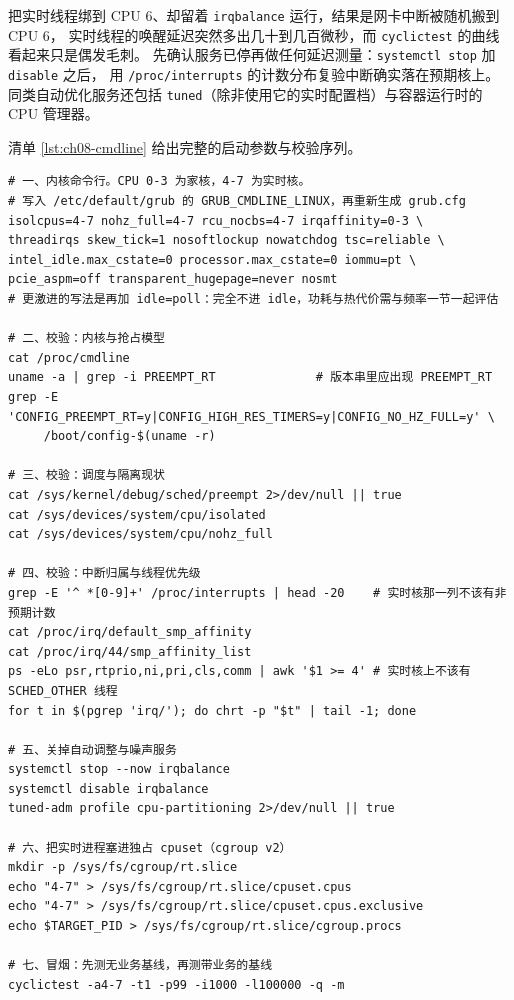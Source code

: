 \documentclass[12pt,a4paper,fontset=fandol]{ctexbook}
\newcommand{\Tp}[1]{\texttt{#1}}
\begin{document}
\begin{warning}[title={只绑核没关 irqbalance：最常见的无效加固}]
把实时线程绑到 CPU 6、却留着 \Tp{irqbalance} 运行，结果是网卡中断被随机搬到 CPU 6，
实时线程的唤醒延迟突然多出几十到几百微秒，而 \Tp{cyclictest} 的曲线看起来只是偶发毛刺。
先确认服务已停再做任何延迟测量：\Tp{systemctl stop} 加 \Tp{disable} 之后，
用 \Tp{/proc/interrupts} 的计数分布复验中断确实落在预期核上。
同类自动优化服务还包括 \Tp{tuned}（除非使用它的实时配置档）与容器运行时的 CPU 管理器。
\end{warning}

清单 \ref{lst:ch08-cmdline} 给出完整的启动参数与校验序列。

\begin{lstlisting}[style=shellstyle,caption={Shell：实时启动参数与校验序列},label={lst:ch08-cmdline}]
# 一、内核命令行。CPU 0-3 为家核，4-7 为实时核。
# 写入 /etc/default/grub 的 GRUB_CMDLINE_LINUX，再重新生成 grub.cfg
isolcpus=4-7 nohz_full=4-7 rcu_nocbs=4-7 irqaffinity=0-3 \
threadirqs skew_tick=1 nosoftlockup nowatchdog tsc=reliable \
intel_idle.max_cstate=0 processor.max_cstate=0 iommu=pt \
pcie_aspm=off transparent_hugepage=never nosmt
# 更激进的写法是再加 idle=poll：完全不进 idle，功耗与热代价需与频率一节一起评估

# 二、校验：内核与抢占模型
cat /proc/cmdline
uname -a | grep -i PREEMPT_RT              # 版本串里应出现 PREEMPT_RT
grep -E 'CONFIG_PREEMPT_RT=y|CONFIG_HIGH_RES_TIMERS=y|CONFIG_NO_HZ_FULL=y' \
     /boot/config-$(uname -r)

# 三、校验：调度与隔离现状
cat /sys/kernel/debug/sched/preempt 2>/dev/null || true
cat /sys/devices/system/cpu/isolated
cat /sys/devices/system/cpu/nohz_full

# 四、校验：中断归属与线程优先级
grep -E '^ *[0-9]+' /proc/interrupts | head -20    # 实时核那一列不该有非预期计数
cat /proc/irq/default_smp_affinity
cat /proc/irq/44/smp_affinity_list
ps -eLo psr,rtprio,ni,pri,cls,comm | awk '$1 >= 4' # 实时核上不该有 SCHED_OTHER 线程
for t in $(pgrep 'irq/'); do chrt -p "$t" | tail -1; done

# 五、关掉自动调整与噪声服务
systemctl stop --now irqbalance
systemctl disable irqbalance
tuned-adm profile cpu-partitioning 2>/dev/null || true

# 六、把实时进程塞进独占 cpuset（cgroup v2）
mkdir -p /sys/fs/cgroup/rt.slice
echo "4-7" > /sys/fs/cgroup/rt.slice/cpuset.cpus
echo "4-7" > /sys/fs/cgroup/rt.slice/cpuset.cpus.exclusive
echo $TARGET_PID > /sys/fs/cgroup/rt.slice/cgroup.procs

# 七、冒烟：先测无业务基线，再测带业务的基线
cyclictest -a4-7 -t1 -p99 -i1000 -l100000 -q -m
\end{lstlisting}
\end{document}
